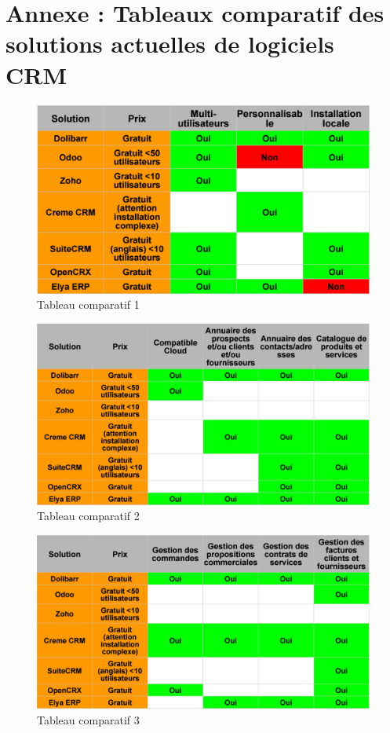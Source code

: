 \documentclass[report]{tnreport}
\begin{document}
\chapter{Annexe : Tableaux comparatif des solutions actuelles de logiciels CRM}
\begin{figure}[h]
  \centering
  \includegraphics[width=13cm]{figures/compare1}
  \caption{Tableau comparatif 1}
  \label{fig:compare1}
\end{figure}
\begin{figure}[h]
  \centering
  \includegraphics[width=13cm]{figures/compare2}
  \caption{Tableau comparatif 2}
  \label{fig:compare2}
\end{figure}
\begin{figure}[h]
  \centering
  \includegraphics[width=13cm]{figures/compare3}
  \caption{Tableau comparatif 3}
  \label{fig:compare3}
\end{figure}
\end{document}
